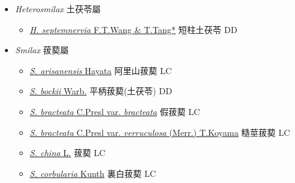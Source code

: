 
  \begin{itemize}
 \item[] \textit{Heterosmilax} 土茯苓屬
                    
  \begin{itemize}
        \item[] \href{http://www.theplantlist.org/tpl1.1/search?q=Heterosmilax+septemnervia}{\textit{H. septemnervia} F.T.Wang \& T.Tang*}   短柱土茯苓 DD
  \end{itemize}
 \item[] \textit{Smilax} 菝葜屬
                    
  \begin{itemize}
        \item[] \href{http://www.theplantlist.org/tpl1.1/search?q=Smilax+arisanensis}{\textit{S. arisanensis} Hayata}   阿里山菝葜 LC
        \item[] \href{http://www.theplantlist.org/tpl1.1/search?q=Smilax+bockii}{\textit{S. bockii} Warb.}        平柄菝葜(土茯苓)   DD
        \item[] \href{http://www.theplantlist.org/tpl1.1/search?q=Smilax+bracteata+var.+bracteata}{\textit{S. bracteata} C.Presl var. \textit{bracteata}}   假菝葜 LC
        \item[] \href{http://www.theplantlist.org/tpl1.1/search?q=Smilax+bracteata+var.+verruculosa}{\textit{S. bracteata} C.Presl var. \textit{verruculosa} (Merr.) T.Koyama}   糙莖菝葜 LC
        \item[] \href{http://www.theplantlist.org/tpl1.1/search?q=Smilax+china}{\textit{S. china} L.}   菝葜 LC
        \item[] \href{http://www.theplantlist.org/tpl1.1/search?q=Smilax+corbularia}{\textit{S. corbularia} Kunth}   裏白菝葜 LC

\end{itemize}
\end{itemize}
